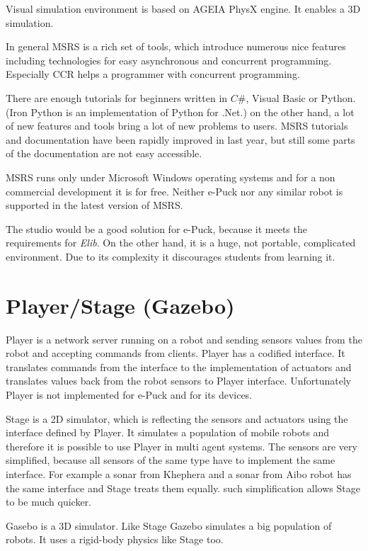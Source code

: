   Visual simulation environment is based on AGEIA PhysX engine. It enables a 3D simulation.
  
  In general MSRS is a rich set of tools, which introduce numerous nice features including
  technologies for easy asynchronous and concurrent programming. Especially CCR helps
  a programmer with concurrent programming. 
  
  There are enough tutorials for beginners written
  in $C\#$, Visual Basic or Python. (Iron Python is an implementation of Python for .Net.)
  on the other hand, a lot of new features and tools bring a lot of new problems to users.
  MSRS tutorials and documentation have been rapidly improved in last year, but still some parts
  of the documentation are not easy accessible.
  
  MSRS runs only under Microsoft Windows operating systems and for a non commercial development
  it is for free. Neither e-Puck nor any similar robot is supported in the latest version of MSRS.
  
  The studio would be a good solution for e-Puck, because it meets the requirements for {\it Elib}.
  On the other hand, it is a huge, not portable, complicated environment.
  Due to its complexity it discourages students from learning it.
\section{Player/Stage (Gazebo) }
  Player\cite{player} is a network server running on a robot and sending 
  sensors values from the robot and
  accepting commands from clients. Player\cite{player} has a codified interface. It translates
  commands from the interface to the implementation of actuators 
  and translates values back from the robot sensors 
  to Player\cite{player} interface. Unfortunately Player\cite{player} is not implemented for e-Puck
  and for its devices.
  
  Stage is a 2D simulator, which is reflecting the sensors and actuators using the interface defined by Player.
  It simulates a population of mobile robots and therefore it is possible to use Player 
  in multi agent systems.
  The sensors are very simplified, because all sensors of the same type 
  have to implement the same interface. For example a sonar from Khephera and a sonar from Aibo robot
  has the same interface and Stage treats them equally. 
  such simplification allows Stage to be much quicker.
  
  Gasebo\cite{player} is a 3D simulator. Like Stage Gazebo simulates a big population of robots.
  It uses a rigid-body physics like Stage too.
  
